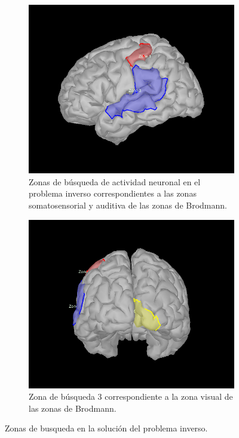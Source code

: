 \begin{figure}[tb]
\centering
    \begin{subfigure}[t]{0.49\textwidth}
        \includegraphics[width=\textwidth]{gfx/zone_1-2.png}
        \caption{Zonas de búsqueda de actividad neuronal en el problema inverso correspondientes a las zonas somatosensorial y auditiva de las zonas de Brodmann.}
        \label{fig:zone1-2}
    \end{subfigure}
	\hfill
    \begin{subfigure}[t]{0.49\textwidth}
        \includegraphics[width=\textwidth]{gfx/zone_3.png}
        \caption{Zona de búsqueda 3 correspondiente a la zona visual de las zonas de Brodmann.}
        \label{fig:zone3}
    \end{subfigure}
    \caption{Zonas de busqueda en la solución del problema inverso.}
    \label{fig:dipoles-zones}
\end{figure}


